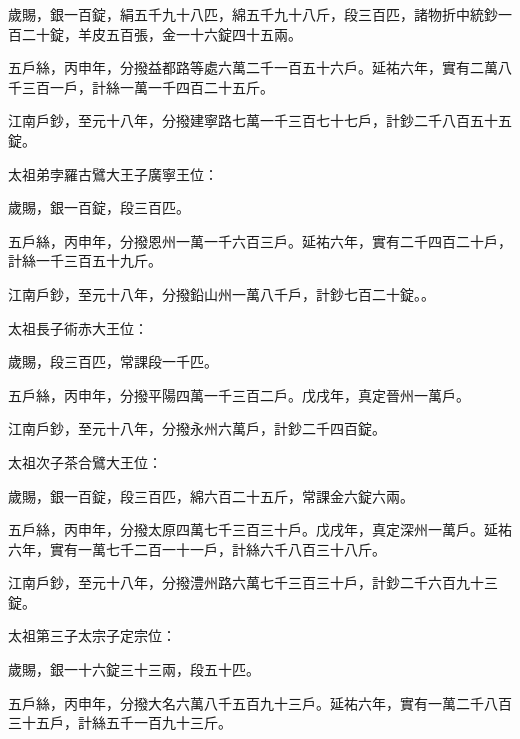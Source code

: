 \begin{pinyinscope}
 歲賜，銀一百錠，絹五千九十八匹，綿五千九十八斤，段三百匹，諸物折中統鈔一百二十錠，羊皮五百張，金一十六錠四十五兩。



 五戶絲，丙申年，分撥益都路等處六萬二千一百五十六戶。延祐六年，實有二萬八千三百一戶，計絲一萬一千四百二十五斤。



 江南戶鈔，至元十八年，分撥建寧路七萬一千三百七十七戶，計鈔二千八百五十五錠。



 太祖弟孛羅古鷿大王子廣寧王位：



 歲賜，銀一百錠，段三百匹。



 五戶絲，丙申年，分撥恩州一萬一千六百三戶。延祐六年，實有二千四百二十戶，計絲一千三百五十九斤。



 江南戶鈔，至元十八年，分撥鉛山州一萬八千戶，計鈔七百二十錠。。



 太祖長子術赤大王位：



 歲賜，段三百匹，常課段一千匹。



 五戶絲，丙申年，分撥平陽四萬一千三百二戶。戊戌年，真定晉州一萬戶。



 江南戶鈔，至元十八年，分撥永州六萬戶，計鈔二千四百錠。



 太祖次子茶合鷿大王位：



 歲賜，銀一百錠，段三百匹，綿六百二十五斤，常課金六錠六兩。



 五戶絲，丙申年，分撥太原四萬七千三百三十戶。戊戌年，真定深州一萬戶。延祐六年，實有一萬七千二百一十一戶，計絲六千八百三十八斤。



 江南戶鈔，至元十八年，分撥澧州路六萬七千三百三十戶，計鈔二千六百九十三錠。



 太祖第三子太宗子定宗位：



 歲賜，銀一十六錠三十三兩，段五十匹。



 五戶絲，丙申年，分撥大名六萬八千五百九十三戶。延祐六年，實有一萬二千八百三十五戶，計絲五千一百九十三斤。




\end{pinyinscope}
